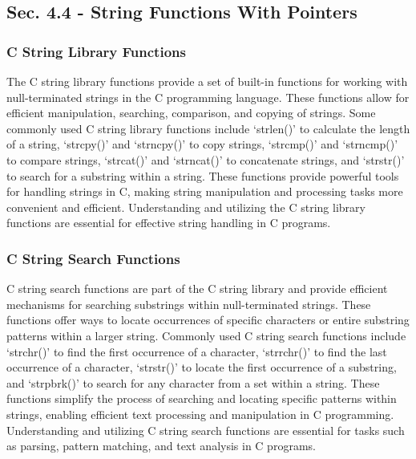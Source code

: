 \subsection*{Sec. 4.4 - String Functions With Pointers}

\subsubsection{C String Library Functions}

The C string library functions provide a set of built-in functions for working with null-terminated strings in the C programming language. These functions allow for efficient manipulation, searching, comparison, and copying of strings. 
Some commonly used C string library functions include `strlen()' to calculate the length of a string, `strcpy()' and `strncpy()' to copy strings, `strcmp()' and `strncmp()' to compare strings, `strcat()' and `strncat()' to concatenate 
strings, and `strstr()' to search for a substring within a string. These functions provide powerful tools for handling strings in C, making string manipulation and processing tasks more convenient and efficient. Understanding and utilizing 
the C string library functions are essential for effective string handling in C programs.

\subsubsection{C String Search Functions}

C string search functions are part of the C string library and provide efficient mechanisms for searching substrings within null-terminated strings. These functions offer ways to locate occurrences of specific characters or entire substring 
patterns within a larger string. Commonly used C string search functions include `strchr()' to find the first occurrence of a character, `strrchr()' to find the last occurrence of a character, `strstr()' to locate the first occurrence of a 
substring, and `strpbrk()' to search for any character from a set within a string. These functions simplify the process of searching and locating specific patterns within strings, enabling efficient text processing and manipulation in C 
programming. Understanding and utilizing C string search functions are essential for tasks such as parsing, pattern matching, and text analysis in C programs.

